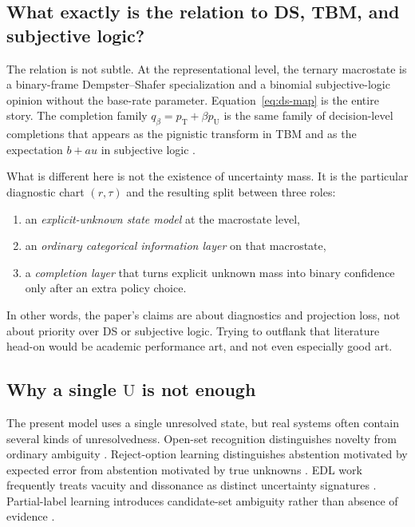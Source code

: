 \documentclass[11pt]{article}
\newcommand{\T}{\mathrm{T}}
\newcommand{\U}{\mathrm{U}}
\newcommand{\1}{\mathbf{1}}
\begin{document}
\subsection{What exactly is the relation to DS, TBM, and subjective logic?}

The relation is not subtle. At the representational level, the ternary macrostate is a binary-frame Dempster--Shafer specialization and a binomial subjective-logic opinion without the base-rate parameter. Equation~\eqref{eq:ds-map} is the entire story. The completion family $q_\beta=p_\T+\beta p_\U$ is the same family of decision-level completions that appears as the pignistic transform in TBM and as the expectation $b+a u$ in subjective logic \citep{SmetsKennes94,Smets90,Josang16}. 

What is different here is not the existence of uncertainty mass. It is the particular diagnostic chart $(r,\tau)$ and the resulting split between three roles:
\begin{enumerate}[leftmargin=1.5em]
    \item an \emph{explicit-unknown state model} at the macrostate level,
    \item an \emph{ordinary categorical information layer} on that macrostate,
    \item a \emph{completion layer} that turns explicit unknown mass into binary confidence only after an extra policy choice.
\end{enumerate}
In other words, the paper's claims are about diagnostics and projection loss, not about priority over DS or subjective logic. Trying to outflank that literature head-on would be academic performance art, and not even especially good art.

\subsection{Why a single $\U$ is not enough}
\label{sec:single-u}

The present model uses a single unresolved state, but real systems often contain several kinds of unresolvedness. Open-set recognition distinguishes novelty from ordinary ambiguity \citep{GengHuangChen21}. Reject-option learning distinguishes abstention motivated by expected error from abstention motivated by true unknowns \citep{FrancPrusaVoracek23}. EDL work frequently treats vacuity and dissonance as distinct uncertainty signatures \citep{AguilarRaducanuRadevaVanDeWeijer23}. Partial-label learning introduces candidate-set ambiguity rather than absence of evidence \citep{FuchsKalinkeBohm24}. 
\end{document}
